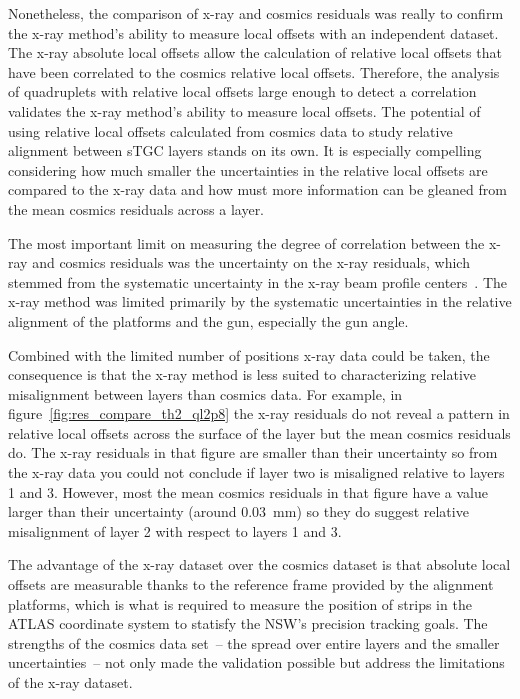 Nonetheless, the comparison of x-ray and cosmics residuals was really to confirm the x-ray method's ability to measure local offsets with an independent dataset. The x-ray absolute local offsets allow the calculation of relative local offsets that have been correlated to the cosmics relative local offsets. Therefore, the analysis of quadruplets with relative local offsets large enough to detect a correlation validates the x-ray method's ability to measure local offsets. The potential of using relative local offsets calculated from cosmics data to study relative alignment between sTGC layers stands on its own. It is especially compelling considering how much smaller the uncertainties in the relative local offsets are compared to the x-ray data and how must more information can be gleaned from the mean cosmics residuals across a layer. 

The most important limit on measuring the degree of correlation between the x-ray and cosmics residuals was the uncertainty on the x-ray residuals, which stemmed from the systematic uncertainty in the x-ray beam profile centers~\cite{lefebvre_precision_2020}. The x-ray method was limited primarily by the systematic uncertainties in the relative alignment of the platforms and the gun, especially the gun angle. %

Combined with the limited number of positions x-ray data could be taken, the consequence is that the x-ray method is less suited to characterizing relative misalignment between layers than cosmics data. For example, in figure~\ref{fig:res_compare_th2_ql2p8} the x-ray residuals do not reveal a pattern in relative local offsets across the surface of the layer but the mean cosmics residuals do. The x-ray residuals in that figure are smaller than their uncertainty so from the x-ray data you could not conclude if layer two is misaligned relative to layers 1 and 3. However, most the mean cosmics residuals in that figure have a value larger than their uncertainty (around \SI{0.03}{\milli\meter}) so they do suggest relative misalignment of layer 2 with respect to layers 1 and 3. 

The advantage of the x-ray dataset over the cosmics dataset is that absolute local offsets are measurable thanks to the reference frame provided by the alignment platforms, which is what is required to measure the position of strips in the ATLAS coordinate system to statisfy the NSW's precision tracking goals. The strengths of the cosmics data set~-- the spread over entire layers and the smaller uncertainties~--  not only made the validation possible but address the limitations of the x-ray dataset.